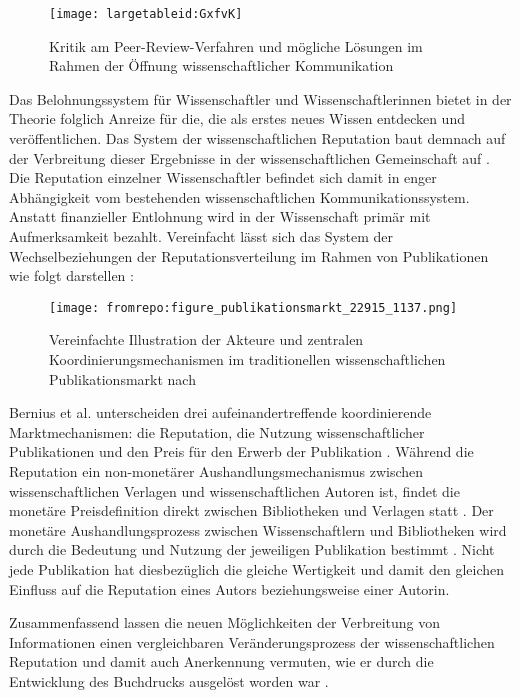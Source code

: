 \begin{figure}[h!]
\texttt{[image: largetableid:GxfvK]}
\caption{Kritik am Peer-Review-Verfahren und mögliche Lösungen im Rahmen der Öffnung wissenschaftlicher Kommunikation}
\end{figure}

Das Belohnungssystem für Wissenschaftler und Wissenschaftlerinnen bietet in der Theorie folglich Anreize für die, die als erstes neues Wissen entdecken und veröffentlichen. Das System der wissenschaftlichen Reputation baut demnach auf der Verbreitung dieser Ergebnisse in der wissenschaftlichen Gemeinschaft auf \cite{Fabrizio_2008}. Die Reputation einzelner Wissenschaftler befindet sich damit in enger Abhängigkeit vom bestehenden wissenschaftlichen Kommunikationssystem. Anstatt finanzieller Entlohnung wird in der Wissenschaft primär mit Aufmerksamkeit bezahlt. Vereinfacht lässt sich das System der Wechselbeziehungen der Reputationsverteilung im Rahmen von Publikationen wie folgt darstellen \cite{Bernius_2009}:

\begin{figure}[h!]
\texttt{[image: fromrepo:figure\_publikationsmarkt\_22915\_1137.png]}
\caption{Vereinfachte Illustration der Akteure und zentralen Koordinierungsmechanismen im traditionellen wissenschaftlichen Publikationsmarkt nach \cite{Bernius_2009}}
\end{figure}

Bernius et al. unterscheiden drei aufeinandertreffende koordinierende Marktmechanismen: die Reputation, die Nutzung wissenschaftlicher Publikationen und den Preis für den Erwerb der Publikation \cite{Bernius_2009}. Während die Reputation ein non-monetärer Aushandlungsmechanismus zwischen wissenschaftlichen Verlagen und wissenschaftlichen Autoren ist, findet die monetäre Preisdefinition direkt zwischen Bibliotheken und Verlagen statt \cite{European_Commission_2006}. Der monetäre Aushandlungsprozess zwischen Wissenschaftlern und Bibliotheken wird durch die Bedeutung und Nutzung der jeweiligen Publikation bestimmt \cite{Bernius_2009}. Nicht jede Publikation hat diesbezüglich die gleiche Wertigkeit \cite{Humbold_Stiftung_2009} und damit den gleichen Einfluss auf die Reputation eines Autors beziehungsweise einer Autorin.

Zusammenfassend lassen die neuen Möglichkeiten der Verbreitung von Informationen einen vergleichbaren Veränderungsprozess der wissenschaftlichen Reputation und damit auch Anerkennung vermuten, wie er durch die Entwicklung des Buchdrucks ausgelöst worden war \cite{Hanekop_2006}.

